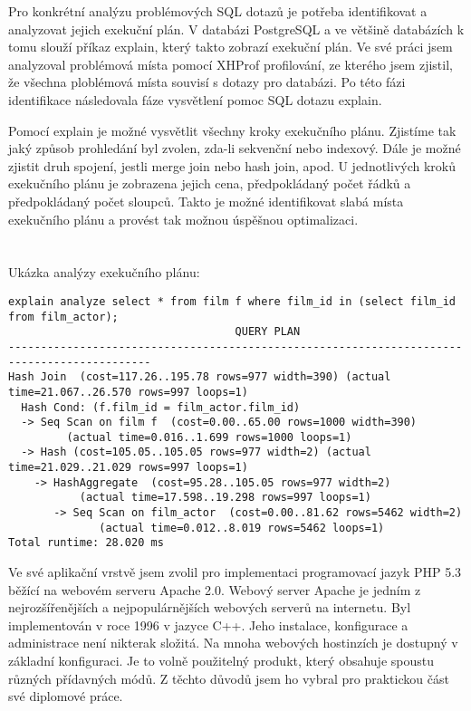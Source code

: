 \documentclass[12pt]{article}
\begin{document}
Pro konkrétní analýzu problémových SQL dotazů je potřeba identifikovat a analyzovat jejich exekuční plán. V databázi PostgreSQL a ve většině databázích k tomu slouží příkaz explain, který takto zobrazí exekuční plán. Ve své práci jsem analyzoval problémová místa pomocí XHProf profilování, ze kterého jsem zjistil, že všechna ploblémová místa souvisí s dotazy pro databázi. Po této fázi identifikace následovala fáze vysvětlení pomoc SQL dotazu explain.

Pomocí explain je možné vysvětlit všechny kroky exekučního plánu. Zjistíme tak jaký způsob prohledání byl zvolen, zda-li sekvenční nebo indexový. Dále je možné zjistit druh spojení, jestli merge join nebo hash join, apod. U jednotlivých kroků exekučního plánu je zobrazena jejich cena, předpokládaný počet řádků a předpokládaný počet sloupců. Takto je možné identifikovat slabá místa exekučního plánu a provést tak možnou úspěšnou optimalizaci.\\
\\
\\ Ukázka analýzy exekučního plánu:
\begin{scriptsize}
\begin{verbatim}
explain analyze select * from film f where film_id in (select film_id from film_actor);
                                   QUERY PLAN
--------------------------------------------------------------------------------------------
Hash Join  (cost=117.26..195.78 rows=977 width=390) (actual time=21.067..26.570 rows=997 loops=1)
  Hash Cond: (f.film_id = film_actor.film_id)
  -> Seq Scan on film f  (cost=0.00..65.00 rows=1000 width=390) 
  	     (actual time=0.016..1.699 rows=1000 loops=1)
  -> Hash (cost=105.05..105.05 rows=977 width=2) (actual time=21.029..21.029 rows=997 loops=1)
    -> HashAggregate  (cost=95.28..105.05 rows=977 width=2) 
           (actual time=17.598..19.298 rows=997 loops=1)
       -> Seq Scan on film_actor  (cost=0.00..81.62 rows=5462 width=2) 
              (actual time=0.012..8.019 rows=5462 loops=1)
Total runtime: 28.020 ms
\end{verbatim}
\end{scriptsize}


Ve své aplikační vrstvě jsem zvolil pro implementaci programovací jazyk PHP 5.3 běžící na webovém serveru Apache 2.0. Webový server Apache je jedním z nejrozšířenějších a nejpopulárnějších webových serverů na internetu. Byl implementován v roce 1996 v jazyce C++. Jeho instalace, konfigurace a administrace není nikterak složitá. Na mnoha webových hostinzích je dostupný v základní konfiguraci. Je to volně použitelný produkt, který obsahuje spoustu různých přídavných módů. Z těchto důvodů jsem ho vybral pro praktickou část své diplomové práce.
\end{document}
